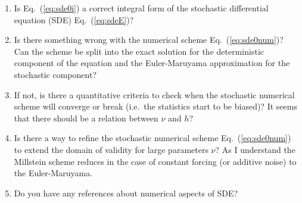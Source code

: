 \documentclass[10pt,a4paper]{article}
\newcommand{\eq}[1]{Eq.~(\ref{#1})}
\newcommand{\SDE}{\renewcommand{\SDE}{SDE\xspace}stochastic differential equation
(SDE)\xspace}
\begin{document}
\begin{enumerate}
\item Is \eq{eq:sde0i} a correct integral form of the \SDE \eq{eq:sdeE}?
\item Is there something wrong with the numerical scheme \eq{eq:sde0num}? 
Can the scheme be split into the exact solution for the deterministic component of the equation 
and the Euler-Maruyama approximation for the stochastic component?
\item If not, is there a quantitative criteria to check when the stochastic numerical
scheme will converge or break (i.e.\ the statistics start to be biased)? 
It seems that there should be a relation between $\nu$ and $h$?
\item Is there a way to refine the stochastic numerical scheme \eq{eq:sde0num} to extend
the domain of validity for large parameters $\nu$? 
As I understand the Millstein scheme reduces in the case
of constant forcing (or additive noise) to the Euler-Maruyama.
\item Do you have any references about numerical aspects of \SDE?
\end{enumerate}


\end{document}
